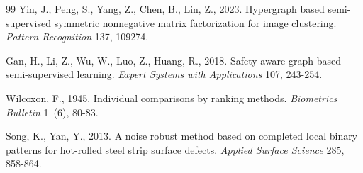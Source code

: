 \documentclass[11pt]{article}
\theoremstyle{remark}
\begin{document}
\begin{thebibliography}{99}
Yin, J., Peng, S., Yang, Z., Chen, B., Lin, Z., 2023.
Hypergraph based semi-supervised symmetric nonnegative matrix factorization for image clustering.
\emph{Pattern Recognition} 137, 109274.

Gan, H., Li, Z., Wu, W., Luo, Z., Huang, R., 2018.
Safety-aware graph-based semi-supervised learning.
\emph{Expert Systems with Applications} 107, 243-254.

Wilcoxon, F., 1945.
Individual comparisons by ranking methods.
\emph{Biometrics Bulletin} 1~(6), 80-83.

Song, K., Yan, Y., 2013.
A noise robust method based on completed local binary patterns for hot-rolled steel strip surface defects.
\emph{Applied Surface Science} 285, 858-864.

\end{thebibliography}
\end{document}
